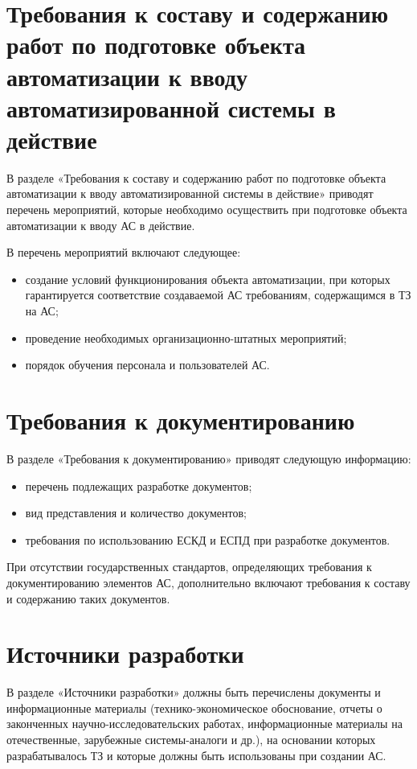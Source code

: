{\section{Требования к составу и содержанию работ по подготовке объекта автоматизации к вводу автоматизированной системы в действие}
В разделе «Требования к составу и содержанию работ по подготовке объекта автоматизации к вводу автоматизированной системы в действие» приводят перечень мероприятий, которые необходимо осуществить при подготовке объекта автоматизации к вводу АС в действие.

В перечень мероприятий включают следующее:
\begin{itemize}
  \item создание условий функционирования объекта автоматизации, при которых гарантируется соответствие создаваемой АС требованиям, содержащимся в ТЗ на АС;
  \item проведение необходимых организационно-штатных мероприятий;
  \item порядок обучения персонала и пользователей АС.
\end{itemize}

\section{Требования к документированию}
В разделе «Требования к документированию» приводят следующую информацию:
\begin{itemize}
  \item перечень подлежащих разработке документов;
  \item вид представления и количество документов;
  \item требования по использованию ЕСКД и ЕСПД при разработке документов.
\end{itemize}
При отсутствии государственных стандартов, определяющих требования к документированию
элементов АС, дополнительно включают требования к составу и содержанию таких документов.

\section{Источники разработки}
В разделе «Источники разработки» должны быть перечислены документы и информационные материалы (технико-экономическое обоснование, отчеты о законченных научно-исследовательских работах, информационные материалы на отечественные, зарубежные системы-аналоги и др.), на основании которых разрабатывалось ТЗ и которые должны быть использованы при создании АС.
}
